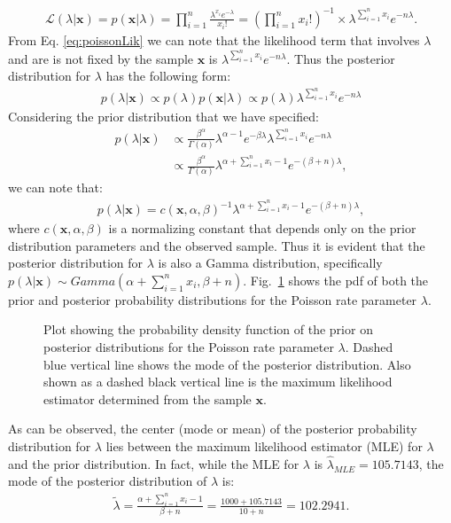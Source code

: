 \begin{DoubleSpace*}
\begin{align}
	\mathcal{L}(\lambda|\textbf{x})=p(\textbf{x}|\lambda)=\prod_{i=1}^n \frac{\lambda^{x_i}e^{-\lambda}}{x_i!}= \left( \prod_{i=1}^n x_i! \right)^{-1} \times \lambda^{\sum_{i=1}^n x_i} e^{-n\lambda}. 
	\label{eq:poissonLik}
\end{align}
From Eq. \ref{eq:poissonLik} we can note that the likelihood term that involves $\lambda$ and are is not fixed by the sample $\textbf{x}$ is $\lambda^{\sum_{i=1}^n x_i} e^{-n\lambda}$. Thus the posterior distribution for $\lambda$ has the following form:
\begin{align}
	p(\lambda|\textbf{x})\propto p(\lambda) p(\textbf{x}|\lambda) \propto p(\lambda)\lambda^{\sum_{i=1}^n x_i} e^{-n\lambda}
\end{align}
Considering the prior distribution that we have specified:
\begin{align}
	p(\lambda|\textbf{x})&\propto \frac{\beta^{\alpha}}{\Gamma(\alpha)}\lambda^{\alpha-1}e^{-\beta \lambda} \lambda^{\sum_{i=1}^n x_i} e^{-n\lambda} \\
	&\propto \frac{\beta^{\alpha}}{\Gamma(\alpha)} \lambda^{\alpha + \sum_{i=1}^n x_i -1} e^{-(\beta+n)\lambda},
\end{align}
we can note that:
\begin{align}
p(\lambda|\textbf{x}) =c(\textbf{x},\alpha,\beta)^{-1} \lambda^{\alpha + \sum_{i=1}^n x_i -1} e^{-(\beta+n)\lambda},
\end{align}
where $c(\textbf{x},\alpha,\beta)$ is a normalizing constant that depends only on the prior distribution parameters and the observed sample. Thus it is evident that the posterior distribution for $\lambda$ is also a Gamma distribution, specifically $p(\lambda|\textbf{x})\sim Gamma(\alpha+ \sum_{i=1}^n x_i, \beta+n)$. Fig.~\ref{fig:pois} shows the pdf of both the prior and posterior probability distributions for the Poisson rate parameter $\lambda$.

\begin{figure}[ht]
	\caption[Poisson example]{Plot showing the probability density function of the prior on posterior distributions for the Poisson rate parameter $\lambda$. Dashed blue vertical line shows the mode of the posterior distribution. Also shown as a dashed black vertical line is the maximum likelihood estimator determined from the sample $\textbf{x}$. \label{fig:pois} }
\end{figure}

As can be observed, the center (mode or mean) of the posterior probability distribution for $\lambda$ lies between the maximum likelihood estimator (MLE) for $\lambda$ and the prior distribution. In fact, while the MLE for $\lambda$ is $\hat{\lambda}_{MLE}=105.7143$, the mode of the posterior distribution of $\lambda$ is:
\begin{align*}
	\tilde{\lambda} = \frac{\alpha+ \sum_{i=1}^n x_i -1}{\beta+n} =\frac{1000+105.7143}{10+n} = 102.2941.
\end{align*}


\end{DoubleSpace*}
